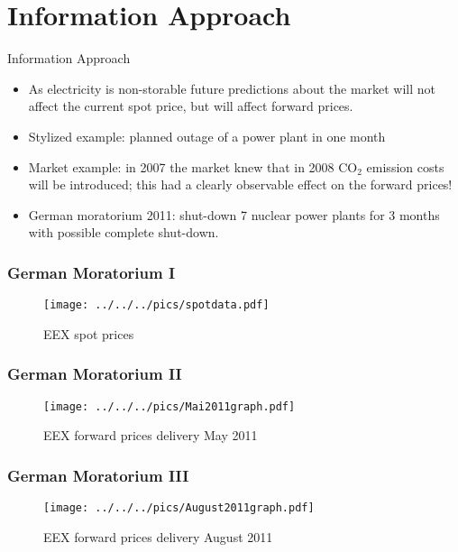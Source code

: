 \section{Information Approach}



{Information Approach}
\begin{itemize}
\item<1-> As electricity is non-storable future predictions about the market will not affect the current spot price, but will affect forward prices.
\item<2-> Stylized example: planned outage of a power plant in one month
\item<3-> Market example: in 2007 the market knew that in 2008 CO$_2$ emission costs will be introduced; this had a clearly observable effect on the forward prices!
\item<4-> German moratorium 2011: shut-down 7 nuclear power plants for 3 months with possible complete shut-down.
\end{itemize}



\begin{frame}
  \frametitle{German Moratorium I}

\begin{figure}[htbp]

  \texttt{[image: ../../../pics/spotdata.pdf]}
    \caption{EEX spot prices}
\end{figure}

\end{frame}

\begin{frame}
  \frametitle{German Moratorium II}

\begin{figure}[htbp]

  \texttt{[image: ../../../pics/Mai2011graph.pdf]}
    \caption{EEX forward prices delivery May 2011}
\end{figure}

\end{frame}
\begin{frame}
  \frametitle{German Moratorium III}

\begin{figure}[htbp]

  \texttt{[image: ../../../pics/August2011graph.pdf]}
    \caption{EEX forward prices delivery August 2011}
\end{figure}

\end{frame}


